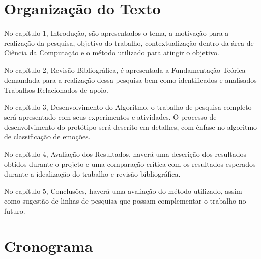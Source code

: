 \documentclass[
	12pt,				%
	openright,			%
	oneside,			%
	a4paper,			%
	english,			%
	spanish,			%
	brazil				%
	]{abntex2}
\begin{document}
	\section{Organização do Texto}
		No capítulo 1, Introdução, são apresentados o tema, a motivação para a realização da pesquisa, objetivo do trabalho, contextualização dentro da área de Ciência da Computação e o método utilizado para atingir o objetivo.
		
		No capítulo 2, Revisão Bibliográfica, é apresentada a Fundamentação Teórica demandada para a realização dessa pesquisa bem como identificados e analisados Trabalhos Relacionados de apoio.
		
		No capítulo 3, Desenvolvimento do Algoritmo, o trabalho de pesquisa completo será apresentado com seus experimentos e atividades. O processo de desenvolvimento do protótipo será descrito em detalhes, com ênfase no algoritmo de classificação de emoções. 
		
		No capítulo 4, Avaliação dos Resultados, haverá uma descrição dos resultados obtidos durante o projeto e uma comparação crítica com os resultados esperados durante a idealização do trabalho e revisão bibliográfica. 

		No capítulo 5, Conclusões, haverá uma avaliação do método utilizado, assim como sugestão de linhas de pesquisa que possam complementar o trabalho no futuro.
	
\section{Cronograma}
	
\end{document}
